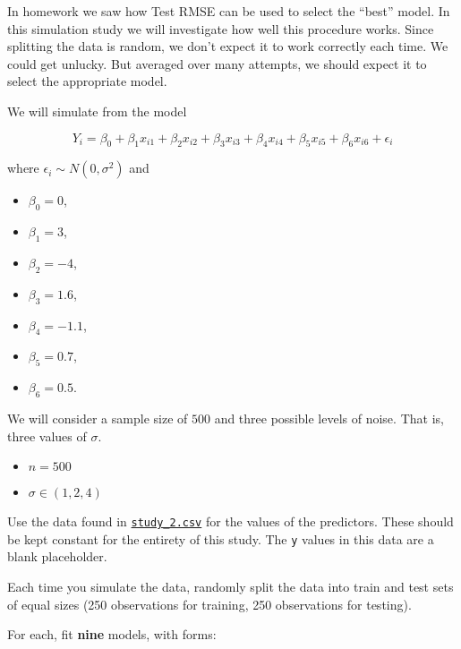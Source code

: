 \documentclass[
]{article}
\providecommand{\tightlist}{%
  \setlength{\itemsep}{0pt}\setlength{\parskip}{0pt}}
\begin{document}
In homework we saw how Test RMSE can be used to select the ``best''
model. In this simulation study we will investigate how well this
procedure works. Since splitting the data is random, we don't expect it
to work correctly each time. We could get unlucky. But averaged over
many attempts, we should expect it to select the appropriate model.

We will simulate from the model

\[
Y_i = \beta_0 + \beta_1 x_{i1} + \beta_2 x_{i2} + \beta_3 x_{i3} + \beta_4 x_{i4} + \beta_5 x_{i5} + \beta_6 x_{i6} + \epsilon_i
\]

where \(\epsilon_i \sim N(0, \sigma^2)\) and

\begin{itemize}
\tightlist
\item
  \(\beta_0 = 0\),
\item
  \(\beta_1 = 3\),
\item
  \(\beta_2 = -4\),
\item
  \(\beta_3 = 1.6\),
\item
  \(\beta_4 = -1.1\),
\item
  \(\beta_5 = 0.7\),
\item
  \(\beta_6 = 0.5\).
\end{itemize}

We will consider a sample size of \(500\) and three possible levels of
noise. That is, three values of \(\sigma\).

\begin{itemize}
\tightlist
\item
  \(n = 500\)
\item
  \(\sigma \in (1, 2, 4)\)
\end{itemize}

Use the data found in \href{study_2.csv}{\texttt{study\_2.csv}} for the
values of the predictors. These should be kept constant for the entirety
of this study. The \texttt{y} values in this data are a blank
placeholder.

Each time you simulate the data, randomly split the data into train and
test sets of equal sizes (250 observations for training, 250
observations for testing).

For each, fit \textbf{nine} models, with forms:
\end{document}
